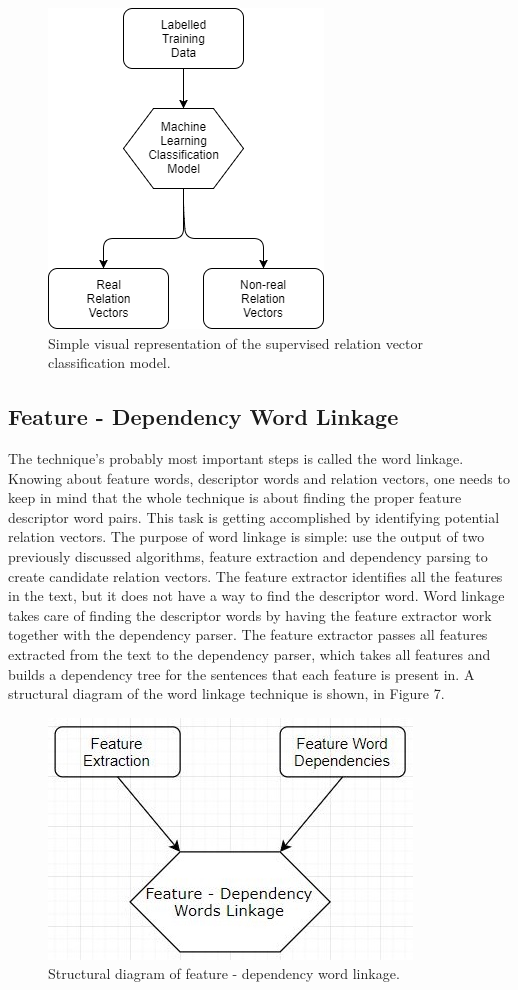 \documentclass{sig-alternate}
\begin{document}
\begin{figure}
\centering
\includegraphics[scale=0.60]{images/machine_learning.png}
\caption{Simple visual representation of the supervised relation vector classification model.}
\end{figure}


\subsection{Feature - Dependency Word Linkage}
The technique's probably most important steps is called the word linkage. Knowing about feature words, descriptor words and relation vectors, one needs to keep in mind that the whole technique is about finding the proper feature descriptor word pairs. This task is getting accomplished by identifying potential relation vectors. The purpose of word linkage is simple: use the output of two previously discussed algorithms, feature extraction and dependency parsing to create candidate relation vectors. The feature extractor identifies all the features in the text, but it does not have a way to find the descriptor word. Word linkage takes care of finding the descriptor words by having the feature extractor work together with the dependency parser. The feature extractor passes all features extracted from the text to the dependency parser, which takes all features and builds a dependency tree for the sentences that each feature is present in. A structural diagram of the word linkage technique is shown, in Figure 7.

\begin{figure}
\centering
\includegraphics[scale=0.60]{images/linkage.JPG}
\caption{Structural diagram of feature - dependency word linkage.}
\end{figure}
\end{document}
